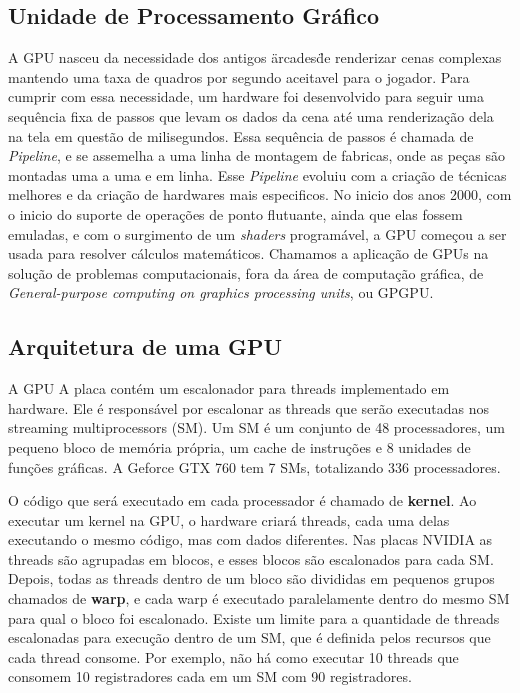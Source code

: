 \subsection{Unidade de Processamento Gráfico}
    A GPU nasceu da necessidade dos antigos \"arcades\" de renderizar cenas complexas mantendo uma taxa de quadros por 
segundo aceitavel para o jogador. Para cumprir com essa necessidade, um hardware foi desenvolvido para seguir uma
sequência fixa de passos que levam os dados da cena até uma renderização dela na tela em questão de milisegundos.
Essa sequência de passos é chamada de \textit{Pipeline}, e se assemelha a uma linha de montagem de fabricas, onde
as peças são montadas uma a uma e em linha. Esse \textit{Pipeline} evoluiu com a criação de técnicas melhores e da criação
de hardwares mais especificos. No inicio dos anos 2000, com o inicio do suporte de operações de ponto flutuante, ainda que
elas fossem emuladas, e com o surgimento de um \textit{shaders} programável, a GPU começou a ser usada para resolver
cálculos matemáticos. Chamamos a aplicação de GPUs na solução de problemas computacionais, fora da área de computação 
gráfica, de \textit{General-purpose computing on graphics processing units}, ou GPGPU. 

\subsection{Arquitetura de uma GPU}

    A GPU 
A placa contém um escalonador para threads implementado em hardware. Ele é responsável por escalonar as threads que serão
executadas nos streaming multiprocessors (SM). Um SM é um conjunto de 48 processadores, um pequeno bloco de memória própria,
um cache de instruções e 8 unidades de funções gráficas. A Geforce GTX 760 tem 7 SMs, totalizando 336 processadores.

O código que será executado em cada processador é chamado de \textbf{kernel}. Ao executar um kernel na GPU, o 
hardware criará threads, cada uma delas executando o mesmo código, mas com dados diferentes. Nas placas NVIDIA as threads 
são agrupadas em blocos, e esses blocos são escalonados para cada SM. Depois, todas as threads dentro de um bloco são 
divididas em pequenos grupos chamados de \textbf{warp}, e cada warp é executado paralelamente dentro do 
mesmo SM para qual o bloco foi escalonado. Existe um limite para a quantidade de threads escalonadas para execução
dentro de um SM, que é definida pelos recursos que cada thread consome. Por exemplo, não há como executar 10 threads
que consomem 10 registradores cada em um SM com 90 registradores.

